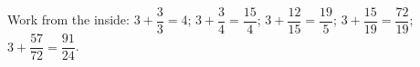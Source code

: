 Work from the inside: $3+\dfrac33=4$; $3+\dfrac34=\dfrac{15}4$; $3+\dfrac{12}{15}=\dfrac{19}5$; $3+\dfrac{15}{19}=\dfrac{72}{19}$; $3+\dfrac{57}{72}=\boxed{\dfrac{91}{24}}$.
